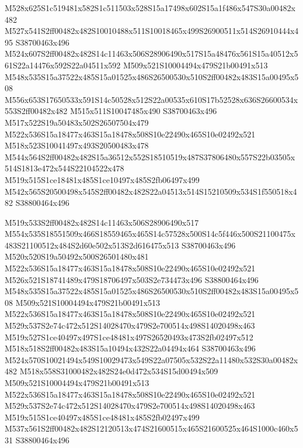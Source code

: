\documentclass{article}
\begin{document}
\begin{multicols}{2}
M528x625S1c519481x582S1c511503x528S15a17498x602S15a1f486x547S30a00482x482 M527x541S2ff00482x482S10010488x511S10018465x499S26900511x514S26910444x495 S38700463x496 M524x607S2ff00482x482S14c11463x506S28906490x517S15a48476x561S15a40512x561S22a14476x592S22a04511x592 M509x521S10004494x479S21b00491x513 M548x535S15a37522x485S15a01525x486S26500530x510S2ff00482x483S15a00495x508 M556x653S17650533x591S14c50528x512S22a00535x610S17b52528x636S26600534x553S2ff00482x482 M515x511S10047485x490 S38700463x496 M517x522S19a50483x502S26507504x479 M522x536S15a18477x463S15a18478x508S10e22490x465S10e02492x521 M518x523S10041497x493S20500483x478 M544x564S2ff00482x482S15a36512x552S18510519x487S37806480x557S22b03505x514S1813e472x544S22104522x478 M519x515S1ce18481x485S1ce10497x485S2fb06497x499 M542x565S20500498x545S2ff00482x482S22a04513x514S15210509x534S1f550518x482 S38800464x496

M519x533S2ff00482x482S14c11463x506S28906490x517 M554x535S18551509x466S18559465x465S14c57528x500S14c5f446x500S21100475x483S21100512x484S2d60e502x513S2d616475x513 S38700463x496 M520x520S19a50492x500S26501480x481 M522x536S15a18477x463S15a18478x508S10e22490x465S10e02492x521 M526x521S18741489x479S18706497x503S2e734473x496 S38800464x496 M548x535S15a37522x485S15a01525x486S26500530x510S2ff00482x483S15a00495x508 M509x521S10004494x479S21b00491x513 M522x536S15a18477x463S15a18478x508S10e22490x465S10e02492x521 M529x537S2e74c472x512S14028470x479S2e700514x498S14020498x463 M519x527S1ce40497x497S1ce48481x497S26520493x473S2fb02497x512 M518x518S2ff00482x483S15a10494x432S22a04494x464 S38700463x496 M524x570S10021494x549S10029473x549S22a07505x532S22a11480x532S30a00482x482 M518x558S31000482x482S24e0d472x534S15d00494x509 M509x521S10004494x479S21b00491x513 M522x536S15a18477x463S15a18478x508S10e22490x465S10e02492x521 M529x537S2e74c472x512S14028470x479S2e700514x498S14020498x463 M519x515S1ce40497x485S1ce48481x485S2fb02497x499 M537x561S2ff00482x482S12120513x474S21600515x465S21600525x464S1000c460x531 S38800464x496


\end{multicols}
\end{document}
